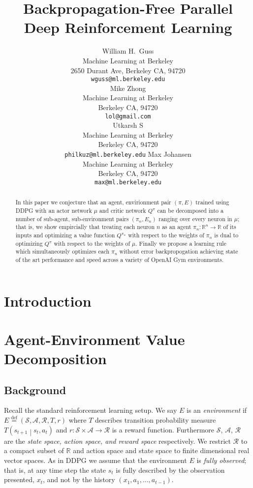 \documentclass{article} %
\title{Backpropagation-Free Parallel Deep Reinforcement Learning}
\author{
William H.~Guss \\
Machine Learning at Berkeley\\
2650 Durant Ave, Berkeley CA, 94720 \\
\texttt{wguss@ml.berkeley.edu} \\
\And
Mike Zhong \\
Machine Learning at Berkeley \\
Berkeley CA, 94720 \\
\texttt{lol@gmail.com} \\
\And
Utkarsh S \\
Machine Learning at Berkeley \\
Berkeley CA, 94720 \\
\texttt{philkuz@ml.berkeley.edu}
\And
Max Johansen \\
Machine Learning at Berkeley \\
Berkeley CA, 94720 \\
\texttt{max@ml.berkeley.edu}
}
\numberwithin{equation}{subsection}
\numberwithin{theorem}{subsection}
\def\suchthat{\mathrel{}\middle|\mathrel{}}
\def\defeq{\stackrel{\text{def}}{=}}
\def\scripta{{\mathcal A}}
\def\scriptr{{\mathcal R}}
\def\scripts{{\mathcal S}}
\begin{document}
\maketitle

\begin{abstract}
    In this paper we conjecture that an agent, envirionment pair $(\pi, E)$ trained using DDPG with an actor network $\mu$ and critic network $Q^{\pi}$ can be decomposed into a number of sub-agent, sub-environment pairs  $(\pi_n, E_n)$ ranging over every neuron in $\mu$; that is, we show empircially that treating each neuron $n$ as an agent $\pi_n: \mathbb{R}^n \to \mathbb{R}$ of its inputs and optimizing a value function $Q^{\pi_n}$ with respect to the weights of $\pi_n$ is dual to optimizing $Q^\pi$ with respect to the weights of $\mu$. Finally we propose a learning rule which simultaneously optimizes each $\pi_n$ without error backpropogation achieving state of the art performance and speed across a variety of OpenAI Gym environments.
\end{abstract}
\listoftodos


\section{Introduction}




\section{Agent-Environment Value Decomposition}


\subsection{Background}
Recall the standard reinforcement learning setup. We say $E$ is an \emph{environment} if $E \defeq (\scripts, \scripta, \scriptr, T, r)$ where $T$ describes transition probability measure $T\left(s_{t+1}\suchthat s_t, a_t\right)$ and $r: \scripts \times \scripta \to \scriptr$ is a reward function. Furthermore $\scripts$, $\scripta$, $\scriptr$ are the \emph{state space, action space, and reward space} respectively. We restrict $\scriptr$ to a compact subset of $\mathbb{R}$ and action space and state space to finite dimensional real vector spaces. As in DDPG we assume that the environment $E$ is \emph{fully observed}; that is, at any time step the state $s_t$ is fully described by the observation presented, $x_t$, and not by the history $(x_1, a_1, \dots, a_{t-1}).$ 
\end{document}
